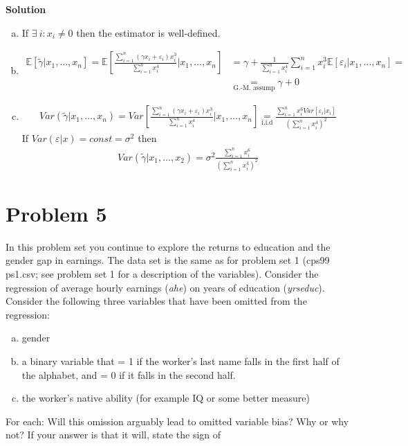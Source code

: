 \documentclass[a4paper]{article}
\newcommand{\expect}{\mathbb{E}}
\newcommand{\summa}{\sum_{i=1}^n}
\begin{document}
\textbf{Solution}


\begin{enumerate}[(a)]
	\item If $\exists\ i: x_i \neq 0$ then the estimator is well-defined.
	\item \begin{align*}
	\expect[\tilde{\gamma}|x_1, \dots, x_n] = \expect\left[\frac{\summa (\gamma x_i + \varepsilon_i)x_i^3}{\summa x_i^4}\bigg|x_1, \dots, x_n\right] &= \gamma + \frac{1}{\summa x_i^4} \summa x_i^3\expect[\varepsilon_i|x_1, \dots, x_n] =\\
	 &\underset{\text{G.-M. assump}}{=} \gamma + 0
	\end{align*}
	\item \begin{align*}
	Var(\tilde{\gamma}|x_1, \dots, x_n) = Var\left[\frac{\summa (\gamma x_i + \varepsilon_i)x_i^3}{\summa x_i^4}\bigg|x_1, \dots, x_n\right] \underset{\text{i.i.d}}{=} \frac{\summa x_i^6 Var[\varepsilon_i|x_i]}{\left(\summa x_i^4\right)^2} 
	\end{align*}
	If $Var(\varepsilon|x) = const = \sigma^2$ then
	\begin{align*}
	Var(\tilde{\gamma}|x_1, \dots, x_2) = \sigma^2 \frac{\summa x_i^6}{\left(\summa x_i^4\right)^2} 
	\end{align*}
\end{enumerate}
\section*{Problem 5}
In this problem set you continue to explore the returns to education and the gender gap
in earnings. The data set is the same as for problem set 1 (cps99 ps1.csv; see problem set 1
for a description of the variables). Consider the regression of average hourly earnings (\textit{ahe}) on
years of education (\textit{yrseduc}). Consider the following three variables that have been omitted
from the regression:
\begin{enumerate}[(a)]
\item gender
\item a binary variable that = 1 if the worker’s last name falls in the first half of the alphabet,
and = 0 if it falls in the second half.
\item the worker’s native ability (for example IQ or some better measure)
\end{enumerate}
For each: Will this omission arguably lead to omitted variable bias? Why or why not?
If your answer is that it will, state the sign of
\end{document}

